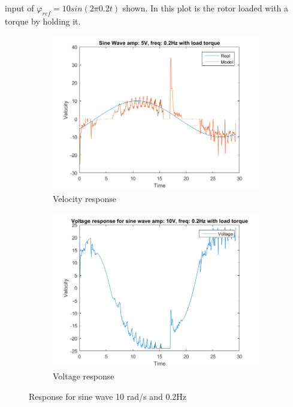 \documentclass[12pt,a4paper]{article}
\begin{document}
input of $\varphi_{ref}=10sin(2\pi 0.2t)$ shown. In this plot is the
rotor loaded with a torque by holding it.
\begin{figure}[H]
  \centering
  \begin{subfigure}[b]{0.45\linewidth}
    \includegraphics[width=\linewidth]{T2_a10_f02_load.png}
    \caption{Velocity response }
    \label{fig:T2_a10_f02_load:a}
  \end{subfigure}
  \begin{subfigure}[b]{0.45\linewidth}
    \includegraphics[width=\linewidth]{T2_V_a10_f02_load.png}
    \caption{Voltage response }
    \label{fig:T2_a10_f02_load:b}
  \end{subfigure}
  \caption{Response for sine wave 10 rad/s and 0.2Hz}
  \label{fig:T2_a10_f02_load}
\end{figure}
\end{document}
